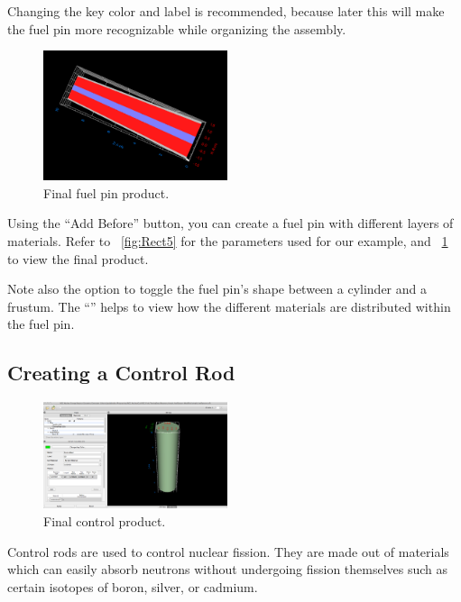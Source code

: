 Changing the key color and label is recommended, because later this will make the fuel pin more recognizable while organizing the assembly.

\begin{figure}
  \begin{center}
    \includegraphics[width=0.48\textwidth]{Images/rect-pin.png}
  \end{center}
  \caption{Final fuel pin product.}
  \label{fig:Rect6}
\end{figure}
Using the ``Add Before'' button, you can create a fuel pin with different layers of materials.  Refer to ~\ref{fig:Rect5} for the parameters used for our example, and ~\ref{fig:Rect6} to view the final product.

Note also the option to toggle the fuel pin's shape between a cylinder and a frustum.  The ``'' helps to view how the different materials are distributed within the fuel pin.

\subsection{Creating a Control Rod}
\begin{figure}
  \begin{center}
    \includegraphics[width=0.48\textwidth]{Images/rect-control-rod.png}
  \end{center}
  \caption{Final control product.}
  \label{fig:Rect7}
\end{figure}

Control rods are used to control nuclear fission. They are made out of materials which can easily absorb neutrons without undergoing fission themselves such as certain isotopes of boron, silver, or cadmium.

